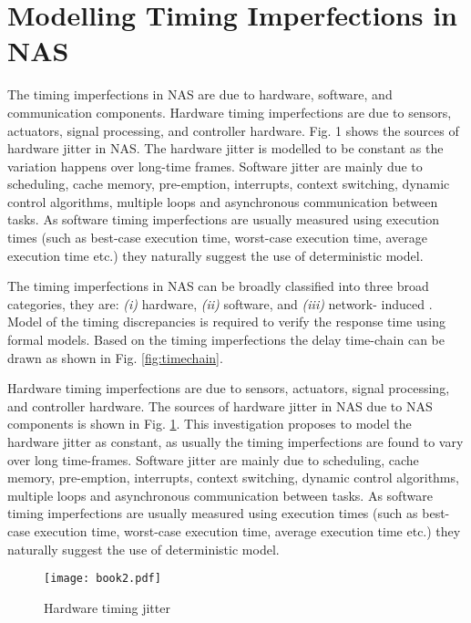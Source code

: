 \documentclass[letterpaper, 10 pt, conference]{ieeeconf}
\begin{document}
\section{Modelling Timing Imperfections in NAS}
The timing imperfections in NAS are due to hardware, software, and communication components. Hardware timing imperfections are due to sensors, actuators, signal processing, and controller hardware. Fig. 1 shows the sources of hardware jitter in NAS. The hardware jitter is modelled to be constant as the variation happens over long-time frames. Software jitter are mainly due to scheduling, cache memory, pre-emption, interrupts, context switching, dynamic control algorithms, multiple loops and asynchronous communication between tasks. As software timing imperfections are usually measured using execution times (such as best-case execution time, worst-case execution time, average execution time etc.) they naturally suggest the use of deterministic model.







The timing imperfections in NAS can be broadly classified into three broad categories, they are: {\em{(i)}} hardware, {\em{(ii)}} software, and {\em{(iii)}} network- induced \cite{SeshThe,SeshCC}. Model of the timing discrepancies is required to verify the response time using formal models. Based on the timing imperfections the delay time-chain can be drawn as shown in Fig. \ref{fig:timechain}. 


Hardware timing imperfections are due to sensors, actuators, signal processing, and controller hardware. The sources of hardware jitter in NAS due to NAS components is shown in Fig. \ref{fig:hardjitter}. This investigation proposes to model the hardware jitter as constant, as usually the timing imperfections are found to vary over long time-frames. Software jitter are mainly due to scheduling, cache memory, pre-emption, interrupts, context switching, dynamic control algorithms, multiple loops and asynchronous communication between tasks. As software timing imperfections are usually measured using execution times (such as best-case execution time, worst-case execution time, average execution time etc.) they naturally suggest the use of deterministic model.

\begin{figure}[h]
\centering
\texttt{[image: book2.pdf]}
\caption{Hardware timing jitter}
\label{fig:hardjitter}
\end{figure}
\end{document}
